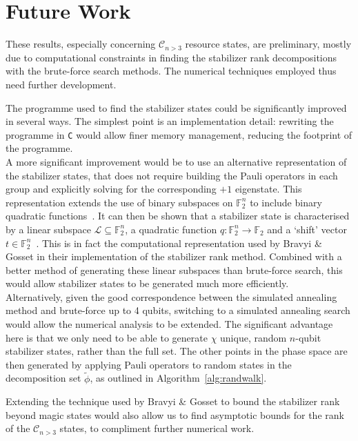 \documentclass{standalone}
\begin{document}
\section*{Future Work}
These results, especially concerning $\mathcal{C}_{n>3}$ resource states, are preliminary, mostly due to computational constraints in finding the stabilizer rank decompositions with the brute-force search methods. The numerical techniques employed thus need further development. 
\par
The programme used to find the stabilizer states could be significantly improved in several ways. The simplest point is an implementation detail: rewriting the programme in \texttt{C} would allow finer memory management, reducing the footprint of the programme. \\
A more significant improvement would be to use an alternative representation of the stabilizer states, that does not require building the Pauli operators in each group and explicitly solving for the corresponding $+1$ eigenstate. This representation extends the use of binary subspaces on $\mathbb{F}_{2}^{n}$ to include binary quadratic functions~\cite{Dehaene2003}. It can then be shown that a stabilizer state is characterised by a linear subspace $\mathcal{L}\subseteq \mathbb{F}_{2}^{n}$, a quadratic function $q:\mathbb{F}_{2}^{n}\rightarrow\mathbb{F}_{2}$ and a `shift' vector $t\in\mathbb{F}_{2}^{n}$~\cite{Dehaene2003,Gross2007}. This is in fact the computational representation used by Bravyi \& Gosset in their implementation of the stabilizer rank method. Combined with a better method of generating these linear subspaces than brute-force search, this would allow stabilizer states to be generated much more efficiently. \\
Alternatively, given the good correspondence between the simulated annealing method and brute-force up to 4 qubits, switching to a simulated annealing search would allow the numerical analysis to be extended. The significant advantage here is that we only need to be able to generate $\chi$ unique, random $n$-qubit stabilizer states, rather than the full set. The other points in the phase space are then generated by applying Pauli operators to random states in the decomposition set $\tilde{\phi}$, as outlined in Algorithm~\ref{alg:randwalk}.
\par
Extending the technique used by Bravyi \& Gosset to bound the stabilizer rank beyond magic states would also allow us to find asymptotic bounds for the rank of the $\mathcal{C}_{n>3}$ states, to compliment further numerical work. 
\end{document}
